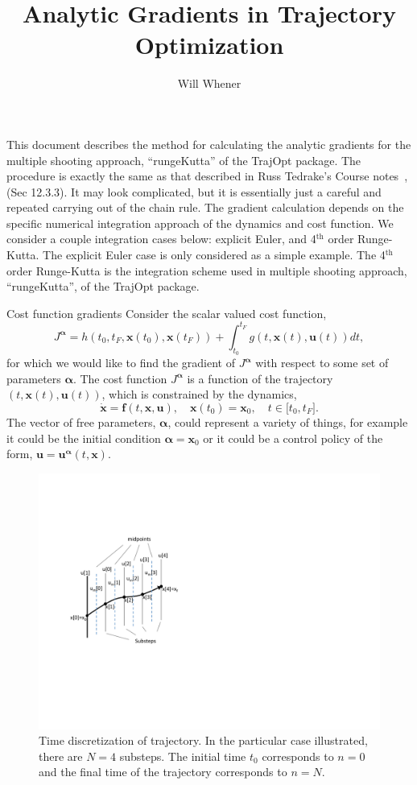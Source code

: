 \documentclass[onecolumn,11pt]{article}
\title{Analytic Gradients in Trajectory Optimization}
\author{Will Whener}
\makeatletter
\newcommand{\bs}{\boldsymbol}
\def\section{\@startsection {section}{1}{\z@}{24pt plus 2pt minus 2pt}
{12pt plus 2pt minus 2pt}{\large\bf\color{RoyalBlue}}}
\makeatother
\begin{document}
\maketitle

This document describes the method for calculating the analytic gradients for the multiple shooting approach, ``rungeKutta'' of the TrajOpt package. The procedure is exactly the same as that described in Russ Tedrake's Course notes~\cite{tedrakeNotes},(Sec 12.3.3). It may look complicated, but it is essentially just a careful and repeated carrying out of the chain rule. The gradient calculation depends on the specific numerical integration approach of the dynamics and cost function. We consider a couple integration cases below: explicit Euler, and 4$^{\text{th}}$ order Runge-Kutta. The explicit Euler case is only considered as a simple example. The 4$^{\text{th}}$ order Runge-Kutta is the integration scheme used in multiple shooting approach, ``rungeKutta'', of the TrajOpt package.

\section{Cost function gradients}
Consider the scalar valued cost function,
\begin{equation}
J^{\bs \alpha} = h(t_0,t_F,\bs x(t_0),\bs x(t_F)) + \int_{t_0}^{t_F}  g(t, \bs x(t), \bs u(t)) dt,
\label{eq:Cost}
\end{equation}
for which we would like to find the gradient of $J^{\bs \alpha}$ with respect to some set of parameters $\bs \alpha$. The cost function $J^{\bs \alpha}$ is a function of the trajectory $(t,\bs x(t),\bs u(t))$, which is constrained by the dynamics,
\begin{equation}
\dot{\bs x} =\bs f(t,\bs x,\bs u), \quad \bs x(t_0) = \bs x_0, \quad t \in \lbrack t_0, t_F\rbrack.
\label{eq:dynamics}
\end{equation}
The vector of free parameters, $\bs \alpha$, could represent a variety of things, for example it could be the initial condition $\bs \alpha = \bs x_0$ or it could be a control policy of the form, $\bs u = \bs u^{\bs \alpha}(t,\bs x)$.

\begin{figure}[h]
\centering
\hspace{0mm}
\includegraphics[width=.38\textwidth]{Figures/singleShooting.pdf}
\vspace{-2mm} 
\caption{Time discretization of trajectory. In the particular case illustrated, there are $N=4$ substeps. The initial time $t_0$ corresponds to $n=0$ and the final time of the trajectory corresponds to $n=N$.}
\label{fig:singleShoot}
\end{figure}
\end{document}
